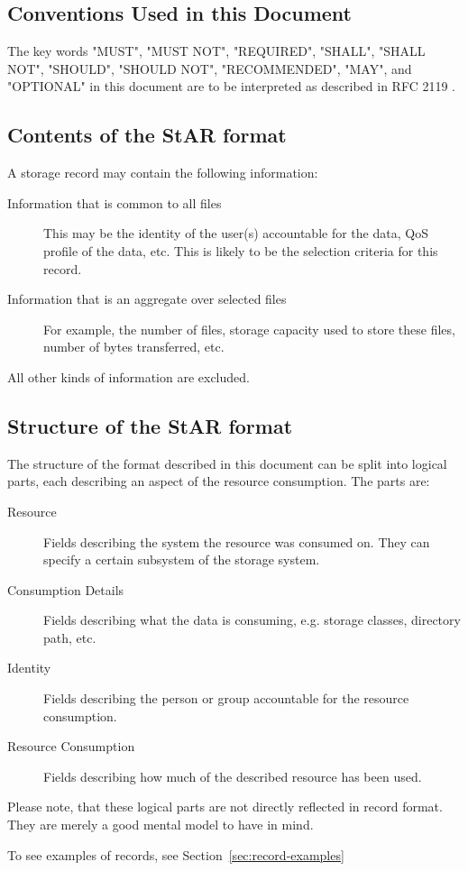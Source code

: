 \subsection{Conventions Used in this Document}
The key words "MUST", "MUST NOT", "REQUIRED", "SHALL", "SHALL NOT", 
"SHOULD", "SHOULD NOT", "RECOMMENDED",  "MAY", and 
"OPTIONAL" in this document are to be interpreted as described in
RFC 2119 \cite{rfc2119}.


\subsection{Contents of the StAR format}
A storage record may contain the following information:
\begin{description}
\item[Information that is common to all files] This may be the identity of the
user(s) accountable for the data, QoS profile of the data, etc. This is likely
to be the selection criteria for this record.
\item[Information that is an aggregate over selected files] For example, the 
number of files, storage capacity used to store these files, number of bytes 
transferred, etc. 
\end{description}
All other kinds of information are excluded.

\subsection{Structure of the StAR format}

The structure of the format described in this document can be split into
logical parts, each describing an aspect of the resource consumption. 
The parts are:

\begin{description}

\item[Resource] Fields describing the system the resource was consumed on. They 
can specify a certain subsystem of the storage system.

\item[Consumption Details] Fields describing what the data is consuming, e.g. 
storage classes, directory path, etc.

\item[Identity] Fields describing the person or group accountable for the
resource consumption.

\item[Resource Consumption] Fields describing how much of the described
resource has been used.

\end{description}

Please note, that these logical parts are not directly reflected in record 
format. They are merely a good mental model to have in mind.

To see examples of records, see Section~\ref{sec:record-examples}
